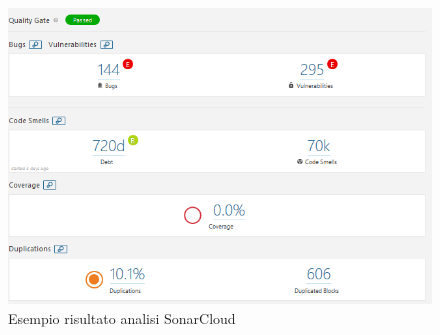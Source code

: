 \begin{figure}[htbp]
	\centering
	\includegraphics[scale=0.5, trim = 0cm 0cm 0cm 0cm, clip=true]{figSonarCloud/analisi.PNG}
	\caption{Esempio risultato analisi SonarCloud}
	\label{fig:analisi}
\end{figure}